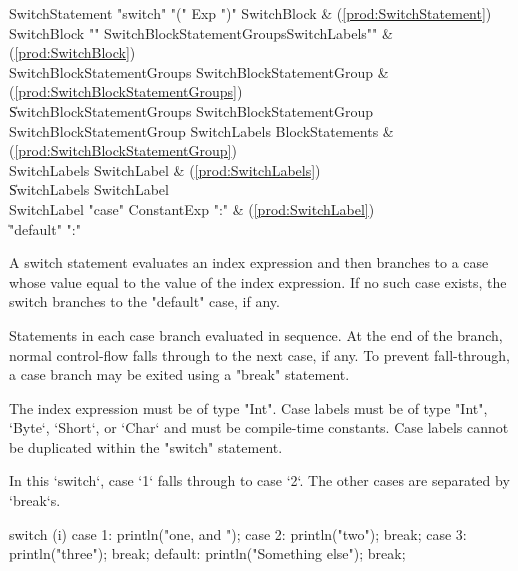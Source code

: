 \begin{bbgrammar}
     SwitchStatement \: \xcd"switch" \xcd"(" Exp \xcd")" SwitchBlock & (\ref{prod:SwitchStatement}) \\
         SwitchBlock \: \xcd"{" SwitchBlockStatementGroups\opt SwitchLabels\opt \xcd"}" & (\ref{prod:SwitchBlock}) \\
SwitchBlockStatementGroups \: SwitchBlockStatementGroup & (\ref{prod:SwitchBlockStatementGroups}) \\
                    \| SwitchBlockStatementGroups SwitchBlockStatementGroup \\
SwitchBlockStatementGroup \: SwitchLabels BlockStatements & (\ref{prod:SwitchBlockStatementGroup}) \\
        SwitchLabels \: SwitchLabel & (\ref{prod:SwitchLabels}) \\
                    \| SwitchLabels SwitchLabel \\
         SwitchLabel \: \xcd"case" ConstantExp \xcd":" & (\ref{prod:SwitchLabel}) \\
                    \| \xcd"default" \xcd":" \\
\end{bbgrammar}

A switch statement evaluates an index expression and then branches to
a case whose value equal to the value of the index expression.
If no such case exists, the switch branches to the 
\xcd"default" case, if any.

Statements in each case branch evaluated in sequence.  At the
end of the branch, normal control-flow falls through to the next case, if
any.  To prevent fall-through, a case branch may be exited using
a \xcd"break" statement.

The index expression must be of type \xcd"Int".
Case labels must be of type \xcd"Int", \xcd`Byte`, \xcd`Short`, or \xcd`Char`
and must be compile-time 
constants.  Case labels cannot be duplicated within the
\xcd"switch" statement.

\begin{ex}
In this \xcd`switch`, case \xcd`1` falls through to case \xcd`2`.  The
other cases are separated by \xcd`break`s.
\begin{xten}
switch (i) {
  case 1: println("one, and ");
  case 2: println("two"); 
          break;
  case 3: println("three");
          break;
  default: println("Something else");
           break;
}
\end{xten}
\end{ex}


